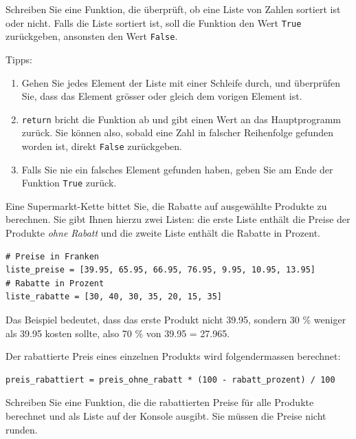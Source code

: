 \begin{mychallenge}
	Schreiben Sie eine Funktion, die überprüft, ob eine Liste von Zahlen sortiert ist oder nicht. Falls die Liste sortiert ist, soll die Funktion den Wert \lstinline|True| zurückgeben, ansonsten den Wert \lstinline|False|.

	Tipps: %
	\begin{enumerate}
		\item Gehen Sie jedes Element der Liste mit einer Schleife durch, und überprüfen Sie, dass das Element grösser oder gleich dem vorigen Element ist.
		\item \lstinline|return| bricht die Funktion ab und gibt einen Wert an das Hauptprogramm zurück. Sie können also, sobald eine Zahl in falscher Reihenfolge gefunden worden ist, direkt \lstinline|False| zurückgeben.
		\item Falls Sie nie ein falsches Element gefunden haben, geben Sie am Ende der Funktion \lstinline|True| zurück.
	\end{enumerate}
	\begin{myanswer}
		
	\end{myanswer}
\end{mychallenge}

\begin{myexercise}
	Eine Supermarkt-Kette bittet Sie, die Rabatte auf ausgewählte Produkte zu berechnen. Sie gibt Ihnen hierzu zwei Listen: die erste Liste enthält die Preise der Produkte \textit{ohne Rabatt} und die zweite Liste enthält die Rabatte in Prozent.

	\begin{lstlisting}
# Preise in Franken
liste_preise = [39.95, 65.95, 66.95, 76.95, 9.95, 10.95, 13.95] 
# Rabatte in Prozent
liste_rabatte = [30, 40, 30, 35, 20, 15, 35] 
\end{lstlisting}

	Das Beispiel bedeutet, dass das erste Produkt nicht 39.95, sondern 30 \% weniger als 39.95 kosten sollte, also 70 \% von 39.95 = 27.965.

	Der rabattierte Preis eines einzelnen Produkts wird folgendermassen berechnet:
	\begin{lstlisting}
preis_rabattiert = preis_ohne_rabatt * (100 - rabatt_prozent) / 100
\end{lstlisting}
	Schreiben Sie eine Funktion, die die rabattierten Preise für alle Produkte berechnet und als Liste auf der Konsole ausgibt. Sie müssen die Preise nicht runden.

	\begin{myanswer}
		
	\end{myanswer}
\end{myexercise}

